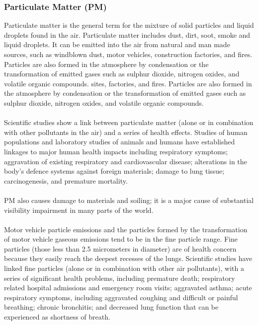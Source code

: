 \subsubsection{Particulate Matter (PM)}
Particulate matter is the general term for the mixture of solid particles and liquid droplets found in the air. Particulate matter includes dust, dirt, soot, smoke and liquid droplets. It can be emitted into the air from natural and man made sources, such as windblown dust, motor vehicles, construction factories, and fires. Particles are also formed in the atmosphere by condensation or the transformation of emitted gases such as sulphur dioxide, nitrogen oxides, and volatile organic compounds. sites, factories, and fires. Particles are also formed in the atmosphere by condensation or the transformation of emitted gases such as sulphur dioxide, nitrogen oxides, and volatile organic compounds.\\\\
Scientific studies show a link between particulate matter (alone or in combination with other
pollutants in the air) and a series of health effects. Studies of human populations and laboratory studies of animals and humans have established linkages to major human health impacts including respiratory symptoms; aggravation of existing respiratory and cardiovascular disease; alterations in the body’s defence systems against foreign materials; damage to lung tissue; carcinogenesis, and premature mortality.\\\\
PM also causes damage to materials and soiling; it is a major cause of substantial visibility impairment in many parts of the world.\\\\
Motor vehicle particle emissions and the particles formed by the transformation of motor vehicle gaseous emissions tend to be in the fine particle range. Fine particles (those less than 2.5 micrometers in diameter) are of health concern because they easily reach the deepest recesses of the lungs. Scientific studies have linked fine particles (alone or in combination with other air pollutants), with a series of significant health problems, including premature death; respiratory related hospital admissions and emergency room visits; aggravated asthma; acute respiratory symptoms, including aggravated coughing and difficult or painful breathing; chronic bronchitis; and decreased lung function that can be experienced as shortness of breath.\\\\
